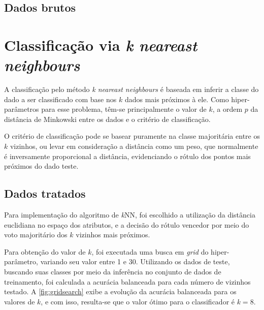 \subsection{Dados brutos}








\section{Classificação via \textit{k neareast neighbours}}

A classificação pelo método \textit{k neareast neighbours} é baseada em inferir a classe do dado a ser classificado com base nos $k$ dados mais próximos à ele. Como hiper-parâmetros para esse problema, têm-se principalmente o valor de $k$, a ordem $p$ da distância de Minkowski entre os dados e o critério de classificação.

O critério de classificação pode se basear puramente na classe majoritária entre os $k$ vizinhos, ou levar em consideração a distância como um peso, que normalmente é inversamente proporcional a distância, evidenciando o rótulo dos pontos mais próximos do dado teste.


\subsection{Dados tratados}

Para implementação do algoritmo de \textit{k}NN, foi escolhido a utilização da distância euclidiana no espaço dos atributos, e a decisão do rótulo vencedor por meio do voto majoritário dos $k$ vizinhos mais próximos.

Para obtenção do valor de $k$, foi executada uma busca em \textit{grid} do hiper-parâmetro, variando seu valor entre 1 e 30. Utilizando os dados de teste, buscando suas classes por meio da inferência no conjunto de dados de treinamento, foi calculada a acurácia balanceada para cada número de vizinhos testado. A \autoref{fig:gridsearch} exibe a evolução da acurácia balanceada para os valores de $k$, e com isso, resulta-se que o valor ótimo para o classificador é $k = 8$.


